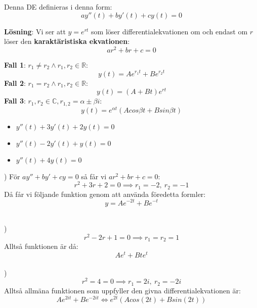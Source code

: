 \documentclass{report}
\begin{document}
{
	Denna DE definieras i denna form:
\begin{equation*}
ay''(t) + by'(t) + cy(t) = 0
\end{equation*}

\textbf{Lösning}:
Vi ser att $ y = e^{rt} $ som löser differentialekvationen om och endast om $ r $ löser den \textbf{karaktäristiska ekvationen}:
\begin{equation*}
ar^2 + br + c = 0
\end{equation*}

\textbf{Fall 1}: $ r_1 \ne r_2 \land r_1, r_2 \in \mathbb{R} $:
\begin{equation*}
	y(t) = Ae^{r_1t} + Be^{r_2t}
\end{equation*}
\textbf{Fall 2}: $ r_1 = r_2 \land r_1,r_2 \in \mathbb{R} $:
\begin{equation*}
	y(t) = (A+Bt)e^{rt}
\end{equation*}
\textbf{Fall 3}: $ r_1, r_2 \in \mathbb{C}, r_{1,2} = \alpha \pm \beta i $:
\begin{equation*}
	y(t) = e^{ \alpha t}(Acos \beta t + Bsin \beta t)
\end{equation*}
}

\pagebreak
{}
{
\begin{itemize}
	\item $ y''(t)+3y'(t)+2y(t) = 0 $
	\item $ y''(t)-2y'(t)+y(t) = 0 $
	\item $ y''(t)+4y(t) = 0 $ 
\end{itemize}

) För $ ay''+by'+cy = 0 $ så får vi $ ar^2+br+c = 0 $:
\begin{equation*}
r^2+3r+2 = 0 \implies r_1 = -2,\: r_2 = -1
\end{equation*}
Då får vi följande funktion genom att använda föredetta formler:
\begin{equation*}
	y = Ae^{-2t} + Be^{-t}
\end{equation*}

\dotfill\\
)
\begin{equation*}
r^2-2r+1 = 0 \implies r_1 = r_2 = 1 
\end{equation*}
Alltså funktionen är då:
\begin{equation*}
Ae^t + Bte^t
\end{equation*}
\dotfill\\
)
\begin{equation*}
r^2 = 4 = 0 \implies r_1 = 2i,\:r_2 = -2i
\end{equation*}
Alltså allmäna funktionen som uppfyller den givna differentialekvationen är:
\begin{equation*}
	Ae^{2it}+Be^{-2it} \iff e^{2t}(Acos(2t) + Bsin(2t) )
\end{equation*}

}
\end{document}
